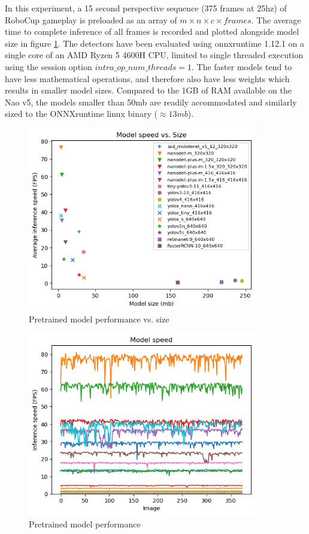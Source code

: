 \documentclass[a4paper,twoside,12pt]{report}
\begin{document}
In this experiment, a 15 second perspective sequence (375 frames at 25hz) of RoboCup gameplay is preloaded as an array of $m \times n \times c \times frames$. The average time to complete inference of all frames is recorded and plotted alongside model size in figure \ref{fig:modelspeedsize}. The detectors have been evaluated using onnxruntime 1.12.1 on a single core of an AMD Ryzen 5 4600H CPU, limited to single threaded execution using the session option $intra\_op\_num\_threads = 1$. The faster models tend to have less mathematical operations, and therefore also have less weights which results in smaller model sizes. Compared to the 1GB of RAM available on the Nao v5, the models smaller than 50mb are readily accommodated and similarly sized to the ONNXruntime linux binary ($\approx13mb$).

\begin{figure}[h!]
\begin{center}
\includegraphics[width=10cm]{images/modelspeedsize.png}
\caption{Pretrained model performance vs. size}
\label{fig:modelspeedsize}
\end{center}
\end{figure}

\begin{figure}[h!]
\begin{center}
\includegraphics[width=10cm]{images/modelspeed.png}
\caption{Pretrained model performance}
\label{fig:modelspeed}
\end{center}
\end{figure}
\end{document}
